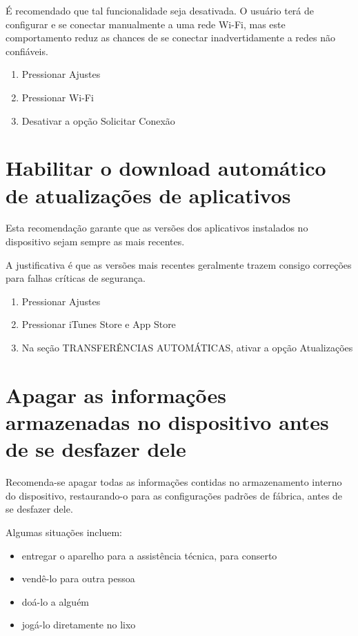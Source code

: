\'E recomendado que tal funcionalidade seja desativada. O usu\'ario ter\'a de configurar e se conectar manualmente a uma rede Wi-Fi, mas este comportamento reduz as chances de se conectar inadvertidamente a redes n\~ao confi\'aveis.

\begin{enumerate}
\item Pressionar Ajustes
\item Pressionar Wi-Fi
\item Desativar a op\c c\~ao Solicitar Conex\~ao 
\end{enumerate}

\section{Habilitar o download autom\'atico de atualiza\c c\~oes de aplicativos}

Esta recomenda\c c\~ao garante que as vers\~oes dos aplicativos instalados no dispositivo sejam sempre as mais recentes. 

A justificativa \'e que as vers\~oes mais recentes geralmente trazem consigo corre\c c\~oes para falhas cr\'iticas de seguran\c ca. 

\begin{enumerate}
\item Pressionar Ajustes
\item Pressionar iTunes Store e App Store
\item Na se\c c\~ao TRANSFER\^ENCIAS AUTOM\'ATICAS, ativar a op\c c\~ao Atualiza\c c\~oes
\end{enumerate}

\section{Apagar as informa\c c\~oes armazenadas no dispositivo antes de se desfazer dele}

Recomenda-se apagar todas as informa\c c\~oes contidas no armazenamento interno do dispositivo, restaurando-o para as configura\c c\~oes padr\~oes de f\'abrica, antes de se desfazer dele. 

Algumas situa\c c\~oes incluem:

\begin{itemize}
\item entregar o aparelho para a assist\^encia t\'ecnica, para conserto
\item vend\^e-lo para outra pessoa
\item do\'a-lo a algu\'em
\item jog\'a-lo diretamente no lixo
\end{itemize}

